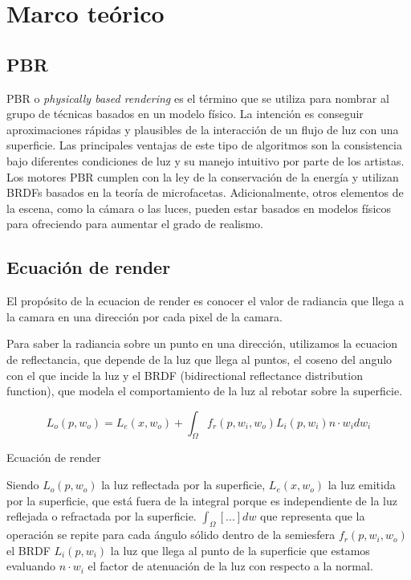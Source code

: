 \chapter{Marco te\'orico}

\section{PBR}
PBR o \textit{physically based rendering} es el t\'ermino que se utiliza para nombrar al grupo de t\'ecnicas basados en un
modelo f\'isico. La intenci\'on es conseguir aproximaciones r\'apidas y plausibles de la interacci\'on de un flujo de luz
con una superficie. Las principales ventajas de este tipo de algoritmos son la consistencia bajo diferentes condiciones de
luz y su manejo intuitivo por parte de los artistas.
Los motores PBR cumplen con la ley de la conservaci\'on de la energ\'ia y utilizan BRDFs basados en la teor\'ia de
microfacetas. Adicionalmente, otros elementos de la escena, como la c\'amara o las luces, pueden estar basados en modelos
f\'isicos para ofreciendo para aumentar el grado de realismo.

\section{Ecuaci\'on de render}
El prop\'osito de la ecuacion de render es conocer el valor de radiancia que llega a la camara en una direcci\'on
por cada pixel  de la camara.

Para saber la radiancia sobre un punto en una direcci\'on, utilizamos la ecuacion de reflectancia, que depende
de la luz que llega al puntos, el coseno del angulo con el que incide la luz y el BRDF (bidirectional reflectance
distribution function), que modela el comportamiento de la luz al rebotar sobre la superficie.\\

\begin{eqfloat}[!htb]
    \begin{equation}
        L_o(p, w_o) = L_e(x, w_o) + \int_\Omega{f_r(p, w_i, w_o) L_i(p, w_i) n\cdot{w_i}dw_i}
    \end{equation}
  \caption{Ecuaci\'on de render}
\end{eqfloat}
\singlespacing

Siendo $L_o(p, w_o)$ la luz reflectada por la superficie, $L_e(x, w_o)$ la luz emitida por la superficie, que est\'a fuera
de la integral porque es independiente de la luz reflejada o refractada por la superficie. $\int_{\Omega}[...]dw$ que representa
que la operaci\'on se repite para cada \'angulo s\'olido dentro de la semiesfera $f_r(p, w_i, w_o)$ el BRDF $L_i(p, w_i)$ la luz
que llega al punto de la superficie que estamos evaluando $n\cdot{w_i}$ el factor de atenuaci\'on de la luz con respecto a la normal.

